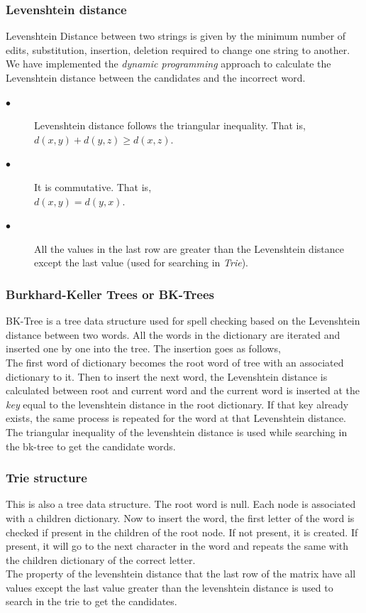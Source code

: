 \documentclass{article}
\begin{document}
			\subsubsection{Levenshtein distance}
				Levenshtein Distance between two strings is given by the minimum number of edits, substitution, insertion, deletion required to change one string to another. We have implemented the \textit{dynamic programming} approach to calculate the Levenshtein distance between the candidates and the incorrect word.
				\begin{description}
					\item[$\bullet$] Levenshtein distance follows the triangular inequality. That is,\\
					$d(x,y) + d(y,z) \geq d(x,z)$.
					\item[$\bullet$] It is commutative. That is,\\ $d(x,y) = d(y,x)$.
					\item[$\bullet$] All the values in the last row are greater than the Levenshtein distance except the last value (used for searching in \textit{Trie}).
				\end{description}
				
			\subsubsection{Burkhard-Keller Trees or BK-Trees}
				BK-Tree is a tree data structure used for spell checking based on the Levenshtein distance between two words. All the words in the dictionary are iterated and inserted one by one into the tree. The insertion goes as follows,\\
				The first word of dictionary becomes the root word of tree with an associated dictionary to it. Then to insert the next word, the Levenshtein distance is calculated between root and current word and the current word is inserted at the \textit{key} equal to the levenshtein distance in the root dictionary. If that key already exists, the same process is repeated for the word at that Levenshtein distance. The triangular inequality of the levenshtein distance is used while searching in the bk-tree to get the candidate words.
			
			\subsubsection{Trie structure}
				This is also a tree data structure. The root word is null. Each node is associated with a children dictionary. Now to insert the word, the first letter of the word is checked if present in the children of the root node. If not present, it is created. If present, it will go to the next character in the word and repeats the same with the children dictionary of the correct letter.\\
				The property of the levenshtein distance that the last row of the matrix have all values except the last value greater than the levenshtein distance is used to search in the trie to get the candidates.
\end{document}
